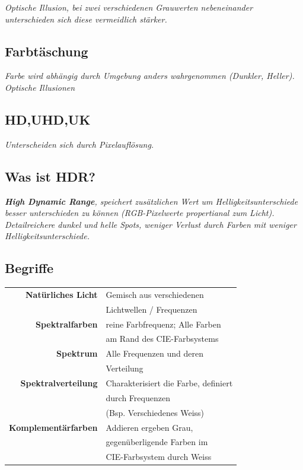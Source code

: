 \textit{
    Optische Illusion, bei zwei verschiedenen Grauwerten nebeneinander
    unterschieden sich diese vermeidlich stärker.
}

\subsection{Farbtäschung}

\textit{
    Farbe wird abhängig durch Umgebung anders wahrgenommen
    (Dunkler, Heller). Optische Illusionen
}

\subsection{HD,UHD,UK}

\textit{Unterscheiden sich durch Pixelauflösung.}

\subsection{Was ist HDR?}

\textit{
    \textbf{High Dynamic Range}, speichert zusätzlichen Wert um
    Helligkeitsunterschiede besser unterschieden zu können
    (RGB-Pixelwerte propertianal zum Licht).
    Detailreichere dunkel und helle Spots, weniger Verlust
    durch Farben mit weniger Helligkeitsunterschiede.
}

\subsection{Begriffe}

\begin{tabular}{r|l}
    \textbf{Natürliches Licht}  & Gemisch aus verschiedenen \\
                                & Lichtwellen / Frequenzen \\
    \textbf{Spektralfarben}     & reine Farbfrequenz; Alle Farben \\
                                & am Rand des CIE-Farbsystems \\
    \textbf{Spektrum}           & Alle Frequenzen und deren \\
                                & Verteilung \\
    \textbf{Spektralverteilung} & Charakterisiert die Farbe, definiert \\
                                & durch Frequenzen \\
                                & (Bsp. Verschiedenes Weiss) \\
    \textbf{Komplementärfarben} & Addieren ergeben Grau, \\
                                & gegenüberligende Farben im \\
                                & CIE-Farbsystem durch Weiss
\end{tabular}

